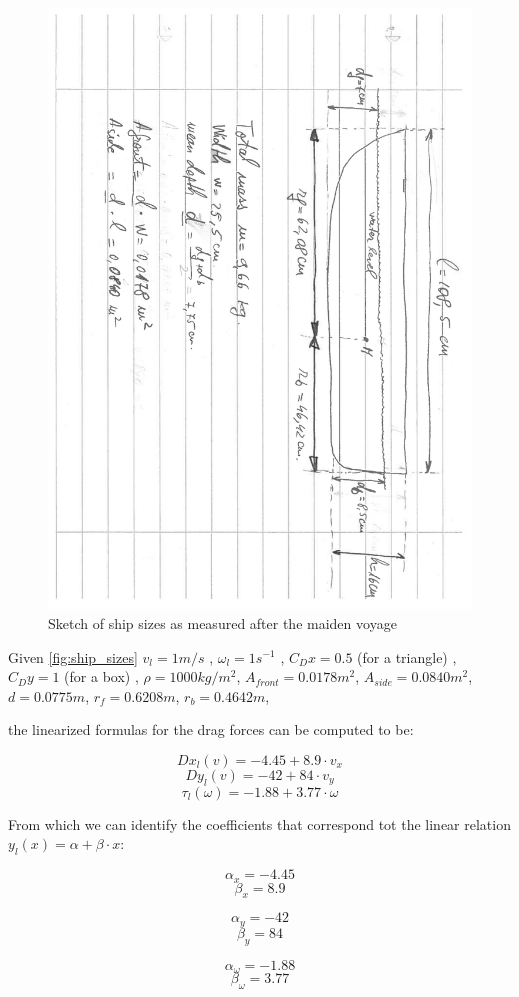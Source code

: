 \begin{figure}[htbp]
	\centering
	\includegraphics[width=\textwidth, trim=1.8cm 0cm 0cm 2cm, clip = true, angle = 90, width=\textwidth]{img/ship_sizes}
	\caption{Sketch of ship sizes as measured after the maiden voyage}
	\label{fig:ship_sizes}
\end{figure}

Given \vref{fig:ship_sizes}
 $ v_{l} = 1m/s $ ,
 $ \omega_{l} = 1 s ^{-1} $ ,
 $ C_{D}x = 0.5 $ (for a triangle) ,
 $ C_{D}y = 1 $ (for a box) ,
 $ \rho = 1000 kg/m ^{2} $,
 $ A_{front} = 0.0178 m^{2} $,
 $ A_{side} = 0.0840 m ^{2} $,
 $ d = 0.0775 m $,
 $ r_{f} = 0.6208 m $,
 $ r_{b} = 0.4642 m $,
 
the linearized formulas for the drag forces can be computed to be:

\[ Dx_{l}(v) = -4.45 + 8.9 \cdot v_{x} \]
\[ Dy_{l}(v) = -42 + 84 \cdot v_{y} \]
\[ \tau_{l}(\omega) = -1.88 + 3.77 \cdot \omega \]

From which we can identify the coefficients that correspond tot the linear relation $ y_{l}(x) = \alpha + \beta \cdot x $:\\
\begin{minipage}{0.3\linewidth}	
\[ \alpha_{x} = -4.45 \] 
\[ \beta_{x} = 8.9 \]
\end{minipage}
\begin{minipage}{0.3\linewidth}	
\[ \alpha_{y} = -42 \] 
\[ \beta_{y} = 84 \]
\end{minipage}
\begin{minipage}{0.3\linewidth}
\[ \alpha_{\omega} = -1.88 \]
\[ \beta_{\omega} = 3.77 \]
\end{minipage}
